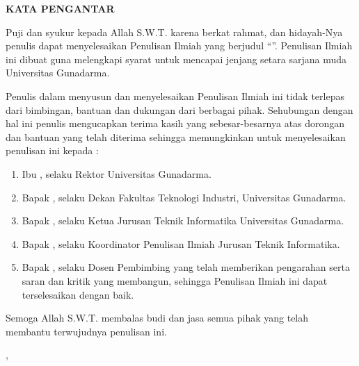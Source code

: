 \newpage
{}
\begin{center}
\begin{large}\textbf{KATA PENGANTAR}\\\end{large}
\end{center}
\vspace{1cm}
Puji dan syukur kepada Allah S.W.T. karena berkat rahmat, dan hidayah-Nya penulis dapat menyelesaikan Penulisan Ilmiah yang berjudul “\textbf{\judul}”. Penulisan Ilmiah ini dibuat guna melengkapi syarat untuk mencapai jenjang setara sarjana muda Universitas Gunadarma.

Penulis dalam menyusun dan menyelesaikan Penulisan Ilmiah ini tidak terlepas dari bimbingan, bantuan dan dukungan dari berbagai pihak. Sehubungan dengan hal ini penulis mengucapkan terima kasih yang sebesar-besarnya atas dorongan dan bantuan yang telah diterima sehingga memungkinkan untuk menyelesaikan penulisan ini kepada :
\begin{enumerate}
    \item Ibu \rektor, selaku Rektor Universitas Gunadarma.
    \item Bapak \dekan, selaku Dekan Fakultas Teknologi Industri, Universitas Gunadarma.
    \item Bapak \kajur, selaku Ketua Jurusan Teknik Informatika Universitas Gunadarma.
    \item Bapak \koorpi, selaku Koordinator Penulisan Ilmiah Jurusan Teknik Informatika.
    \item Bapak \dospem, selaku Dosen Pembimbing yang telah memberikan pengarahan serta saran dan kritik yang membangun, sehingga Penulisan Ilmiah ini dapat terselesaikan dengan baik.
\end{enumerate}
Semoga Allah S.W.T. membalas budi dan jasa semua pihak yang telah membantu terwujudnya penulisan ini.

\vspace{0.5 cm}
\begin{flushright}
\kotapembuatan, \bulanpembuatan\hspace{1mm}\tahunpembuatan

\vspace{1.5 cm}
\namapenulis
\end{flushright} 
\newpage